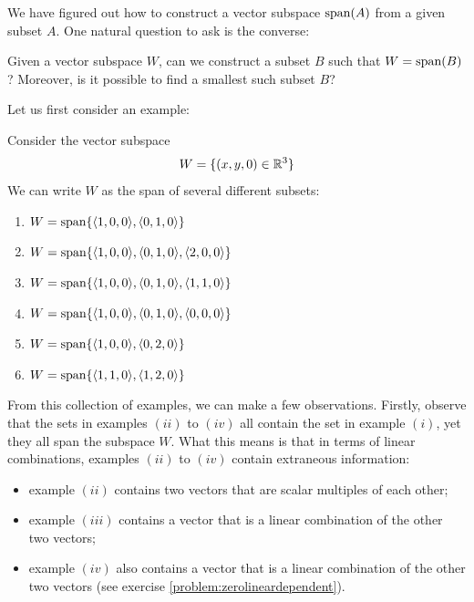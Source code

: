    We have figured out how to construct a vector subspace $\textnormal{span}(A)$ from a given subset $A$.  One natural question to ask is the converse:
    
    \begin{motivating}
     Given a vector subspace $W$, can we construct a subset $B$ such that $W = \textnormal{span}(B)$?  Moreover, is it possible to find a smallest such subset $B$?  
    \end{motivating}
    
    Let us first consider an example:
    
    \begin{example}
    Consider the vector subspace $$W = \{(x, y, 0) \in \mathbb{R}^3 \}$$
    We can write $W$ as the span of several different subsets:
    \begin{enumerate}[label=(\roman*)]
        \item $W= \textnormal{span}\{\langle 1,0,0\rangle, \langle 0,1,0\rangle\}$
        \item $W= \textnormal{span}\{\langle 1,0,0\rangle, \langle 0,1,0\rangle, \langle 2,0,0\rangle\}$
        \item $W= \textnormal{span}\{\langle 1,0,0\rangle, \langle 0,1,0\rangle,\langle 1,1,0\rangle\}$
        \item $W= \textnormal{span}\{\langle 1,0,0\rangle, \langle 0,1,0\rangle, \langle 0, 0, 0\rangle\}$
        \item $W= \textnormal{span}\{\langle 1,0,0\rangle, \langle 0,2,0\rangle\}$
        \item $W= \textnormal{span}\{\langle 1,1,0\rangle, \langle 1,2,0\rangle\}$
    \end{enumerate}
    
    \end{example}
    
    From this collection of examples, we can make a few observations.   Firstly, observe that the sets in examples $(ii)$ to $(iv)$ all contain the set in example $(i)$, yet they all span the subspace $W$.  What this means is that in terms of linear combinations, examples $(ii)$ to $(iv)$ contain extraneous information:
    \begin{itemize}
        \item example $(ii)$ contains two vectors that are scalar multiples of each other;
        \item example $(iii)$ contains a vector that is a linear combination of the other two vectors;
        \item example $(iv)$ also contains a vector that is a linear combination of the other two vectors (see exercise \ref{problem:zerolineardependent}).
    \end{itemize}


